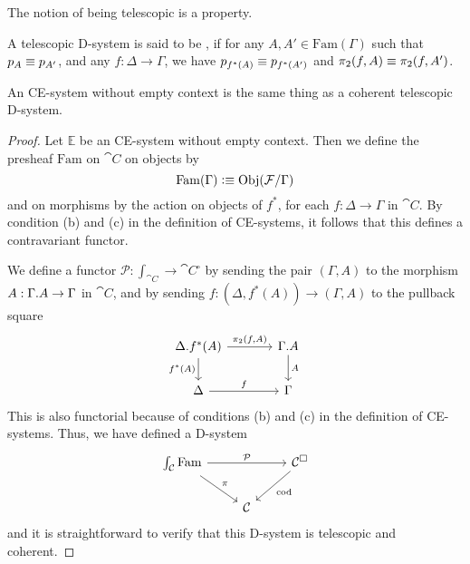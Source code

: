 \begin{conj}
The notion of being telescopic is a property.
\end{conj}

\begin{defn}
A telescopic D-system is said to be , if for any $A,A'\in\mathrm{Fam}(\Gamma)$
such that $p_A\equiv p_{A'}$, and any $f:\Delta\to\Gamma$, we have
$p_{f^\ast(A)}\equiv p_{f^\ast(A')}$ and $\pi_2(f,A)\equiv \pi_2(f,A')$.
\end{defn}

\begin{thm}
An CE-system without empty context is the same thing as a coherent telescopic D-system.
\end{thm}

\begin{proof}
Let $\mathbb{E}$ be an CE-system without empty context. Then we define the
presheaf $\mathrm{Fam}$ on $\cat{C}$ on objects by
\begin{equation*}
\mathrm{Fam}(\Gamma)\vcentcolon\equiv \mathrm{Obj}(\mathcal{F}/\Gamma)
\end{equation*}
and on morphisms by the action on objects of $f^\ast$, for each $f:\Delta\to
\Gamma$ in $\cat{C}$. By condition (b) and (c) in the definition of CE-systems, it
follows that this defines a contravariant functor. 

We define a functor $\mathcal{P}:\int_{\cat{C}}\to\cat{C}^\square$ by sending
the pair $(\Gamma,A)$ to the morphism $A:\ctxext{\Gamma}{A}\to\Gamma$ in
$\cat{C}$, and by sending $f:(\Delta,f^\ast(A))\to (\Gamma,A)$ to the pullback
square
\begin{equation*}
\begin{tikzcd}[column sep=large]
\ctxext{\Delta}{f^\ast(A)} \arrow[d,swap,"{f^\ast(A)}"] \arrow[r,"{\pi_2(f,A)}"] &
\ctxext{\Gamma}{A} \arrow[d,"A"] \\ \Delta \arrow[r,"f"] & \Gamma
\end{tikzcd}
\end{equation*}
This is also functorial because of conditions (b) and (c) in the definition of
CE-systems. Thus, we have defined a D-system
\begin{equation*}
\begin{tikzcd}
\int_{\cat{C}}\mathrm{Fam} \arrow[rr,"{\mathcal{P}}"] \arrow[dr,"{\pi}"] & & \cat{C}^\square \arrow[dl,"{\mathrm{cod}}"] \\ & \cat{C}
\end{tikzcd}
\end{equation*}
and it is straightforward to verify that this D-system is telescopic and coherent.


\end{proof}
